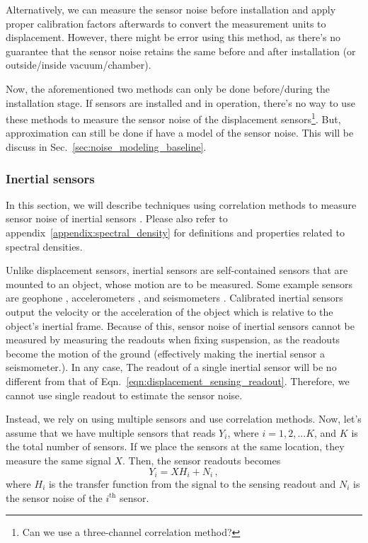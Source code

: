 Alternatively, we can measure the sensor noise before installation and apply proper calibration factors afterwards to convert the measurement units to displacement.
However, there might be error using this method, as there's no guarantee that the sensor noise retains the same before and after installation (or outside/inside vacuum/chamber).

Now, the aforementioned two methods can only be done before/during the installation stage.
If sensors are installed and in operation, there's no way to use these methods to measure the sensor noise of the displacement sensors\footnote{Can we use a three-channel correlation method?}.
But, approximation can still be done if have a model of the sensor noise.
This will be discuss in Sec.~\ref{sec:noise_modeling_baseline}.

\subsubsection{Inertial sensors}
In this section, we will describe techniques using correlation methods to measure sensor noise of inertial sensors \cite{technique_for_measurement_of_the_noise, Sleeman2006ThreeChannelCA}. Please also refer to appendix~\ref{appendix:spectral_density} for definitions and properties related to spectral densities.

Unlike displacement sensors, inertial sensors are self-contained sensors that are mounted to an object, whose motion are to be measured.
Some example sensors are geophone \cite{Sekiguchi:2016bmv}, accelerometers \cite{status_of_acc_development_2}, and seismometers \cite{trillium_compact_120-sv1}.
Calibrated inertial sensors output the velocity or the acceleration of the object which is relative to the object's inertial frame.
Because of this, sensor noise of inertial sensors cannot be measured by measuring the readouts when fixing suspension, as the readouts become the motion of the ground (effectively making the inertial sensor a seismometer.).
In any case, The readout of a single inertial sensor will be no different from that of Eqn.~\eqref{eqn:displacement_sensing_readout}.
Therefore, we cannot use single readout to estimate the sensor noise.

Instead, we rely on using multiple sensors and use correlation methods.
Now, let's assume that we have multiple sensors that reads $Y_i$, where $i=1,2,...K$, and $K$ is the total number of sensors.
If we place the sensors at the same location, they measure the same signal $X$.
Then, the sensor readouts becomes
\begin{equation}
	Y_i = XH_i + N_i\,,
	\label{eqn:inertial_sensing_readout}
\end{equation}
where $H_i$ is the transfer function from the signal to the sensing readout and $N_i$ is the sensor noise of the $i^\mathrm{th}$ sensor.

